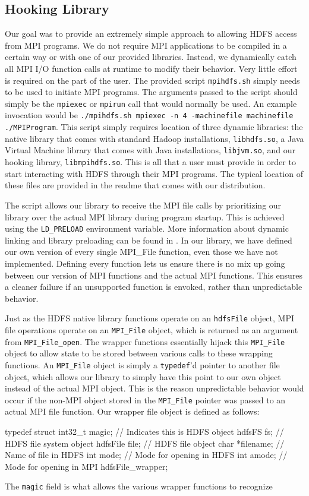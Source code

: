 \subsection{Hooking Library}
Our goal was to provide an extremely simple approach to allowing HDFS access from MPI programs. We do not require MPI applications to be compiled in a certain way or with one of our provided libraries. Instead, we dynamically catch all MPI I/O function calls at runtime to modify their behavior. Very little effort is required on the part of the user. The provided script \texttt{mpihdfs.sh} simply needs to be used to initiate MPI programs. The arguments passed to the script should simply be the \texttt{mpiexec} or \texttt{mpirun} call that would normally be used. An example invocation would be \texttt{./mpihdfs.sh mpiexec -n 4 -machinefile machinefile ./MPIProgram}. This script simply requires location of three dynamic libraries: the native library that comes with standard Hadoop installations, \texttt{libhdfs.so}, a Java Virtual Machine library that comes with Java installations, \texttt{libjvm.so}, and our hooking library, \texttt{libmpihdfs.so}. This is all that a user must provide in order to start interacting with HDFS through their MPI programs. The typical location of these files are provided in the readme that comes with our distribution.

The script allows our library to receive the MPI file calls by prioritizing our library over the actual MPI library during program startup. This is achieved using the \texttt{LD_PRELOAD} environment variable. More information about dynamic linking and library preloading can be found in \cite{ld.so}. In our library, we have defined our own version of every single MPI_File function, even those we have not implemented. Defining every function lets us ensure there is no mix up going between our version of MPI functions and the actual MPI functions. This ensures a cleaner failure if an unsupported function is envoked, rather than unpredictable behavior. 

Just as the HDFS native library functions operate on an \texttt{hdfsFile} object, MPI file operations operate on an \texttt{MPI_File} object, which is returned as an argument from \texttt{MPI_File_open}. The wrapper functions essentially hijack this \texttt{MPI_File} object to allow state to be stored between various calls to these wrapping functions. An \texttt{MPI_File} object is simply a \texttt{typedef}'d pointer to another file object, which allows our library to simply have this point to our own object instead of the actual MPI object. This is the reason unpredictable behavior would occur if the non-MPI object stored in the \texttt{MPI_File} pointer was passed to an actual MPI file function. Our wrapper file object is defined as follows:

{\ttfamily
typedef struct
{
	int32_t magic;	// Indicates this is HDFS object
	hdfsFS fs;	// HDFS file system object
	hdfsFile file;	// HDFS file object
	char *filename; // Name of file in HDFS
	int mode;	// Mode for opening in HDFS
	int amode;	// Mode for opening in MPI
} hdfsFile_wrapper;
}

The \texttt{magic} field is what allows the various wrapper functions to recognize 
